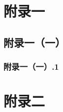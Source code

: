 
\begin{appendices}
    \section{附录一}
        \subsection{附录一（一）}
            \subsubsection{附录一（一）.1}
    \section{附录二}
\end{appendices}